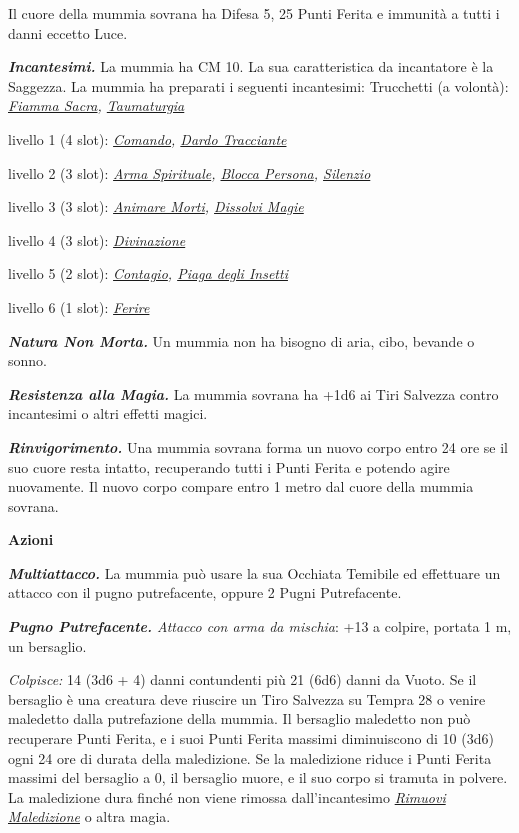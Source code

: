 \begin{multicols}{2}
{Il cuore della mummia sovrana ha Difesa 5, 25 Punti Ferita e immunità a tutti i danni eccetto Luce.

\emph{\textbf{Incantesimi.}} La mummia ha CM 10. La sua caratteristica da incantatore è la Saggezza. La mummia ha preparati i seguenti incantesimi: Trucchetti (a volontà): \emph{\hyperlink{Fiamma Sacra}{Fiamma Sacra}, \hyperlink{Taumaturgia}{Taumaturgia}}

livello 1 (4 slot): \emph{\hyperlink{Comando}{Comando}, \hyperlink{Dardo Tracciante}{Dardo Tracciante}}

livello 2 (3 slot): \emph{\hyperlink{Arma Spirituale}{Arma Spirituale}, \hyperlink{Blocca Persona}{Blocca Persona}, \hyperlink{Silenzio}{Silenzio}}

livello 3 (3 slot): \emph{\hyperlink{Animare Morti}{Animare Morti}, \hyperlink{Dissolvi Magie}{Dissolvi Magie}}

livello 4 (3 slot): \emph{\hyperlink{Divinazione}{Divinazione}}

livello 5 (2 slot): \emph{\hyperlink{Contagio}{Contagio}, \hyperlink{Piaga degli Insetti}{Piaga degli Insetti}}

livello 6 (1 slot): \emph{\hyperlink{Ferire}{Ferire}}

\emph{\textbf{Natura Non Morta.}} Un mummia non ha bisogno di aria, cibo, bevande o sonno.

\emph{\textbf{Resistenza alla Magia.}} La mummia sovrana ha +1d6 ai Tiri Salvezza contro incantesimi o altri effetti magici.

\emph{\textbf{Rinvigorimento.}} Una mummia sovrana forma un nuovo corpo entro 24 ore se il suo cuore resta intatto, recuperando tutti i Punti Ferita e potendo agire nuovamente. Il nuovo corpo compare entro 1 metro dal cuore della mummia sovrana.

\textbf{Azioni}

\emph{\textbf{Multiattacco.}} La mummia può usare la sua Occhiata Temibile ed effettuare un attacco con il pugno putrefacente, oppure 2 Pugni Putrefacente.

\emph{\textbf{Pugno Putrefacente.} Attacco con arma da mischia}: +13 a colpire, portata 1 m, un bersaglio.

\emph{Colpisce:} 14 (3d6 + 4) danni contundenti più 21 (6d6) danni da Vuoto. Se il bersaglio è una creatura deve riuscire un Tiro Salvezza su Tempra 28 o venire maledetto dalla putrefazione della mummia. Il bersaglio maledetto non può recuperare Punti Ferita, e i suoi Punti Ferita massimi diminuiscono di 10 (3d6) ogni 24 ore di durata della maledizione. Se la maledizione riduce i Punti Ferita massimi del bersaglio a 0, il bersaglio muore, e il suo corpo si tramuta in polvere. La maledizione dura finché non viene rimossa dall'incantesimo \emph{\hyperlink{Rimuovi Maledizione}{Rimuovi Maledizione}} o altra magia.

}
\end{multicols}
